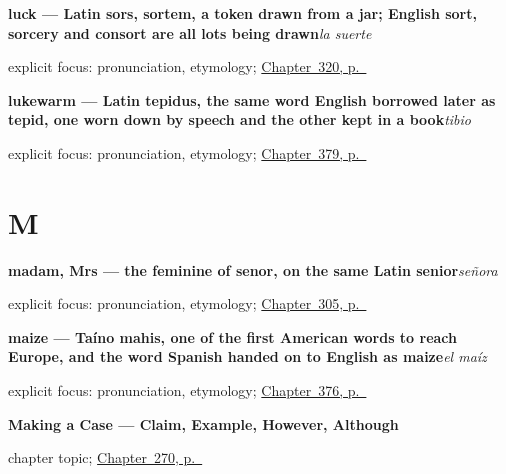\noindent\begin{minipage}[t]{\linewidth}
\raggedright
\textbf{luck — Latin sors, sortem, a token drawn from a jar; English sort, sorcery and consort are all lots being drawn}\enspace\emph{la suerte}\par
\footnotesize explicit focus: pronunciation, etymology; \hyperref[ch:favor-y-culpa]{Chapter~320, p.~\pageref*{ch:favor-y-culpa}}
\end{minipage}\par\smallskip

\noindent\begin{minipage}[t]{\linewidth}
\raggedright
\textbf{lukewarm — Latin tepidus, the same word English borrowed later as tepid, one worn down by speech and the other kept in a book}\enspace\emph{tibio}\par
\footnotesize explicit focus: pronunciation, etymology; \hyperref[ch:seco-y-mojado]{Chapter~379, p.~\pageref*{ch:seco-y-mojado}}
\end{minipage}\par\smallskip

\section*{M}

\noindent\begin{minipage}[t]{\linewidth}
\raggedright
\textbf{madam, Mrs — the feminine of senor, on the same Latin senior}\enspace\emph{señora}\par
\footnotesize explicit focus: pronunciation, etymology; \hyperref[ch:nombre-y-apellido]{Chapter~305, p.~\pageref*{ch:nombre-y-apellido}}
\end{minipage}\par\smallskip

\noindent\begin{minipage}[t]{\linewidth}
\raggedright
\textbf{maize — Taíno mahis, one of the first American words to reach Europe, and the word Spanish handed on to English as maize}\enspace\emph{el maíz}\par
\footnotesize explicit focus: pronunciation, etymology; \hyperref[ch:la-harina-y-la-uva]{Chapter~376, p.~\pageref*{ch:la-harina-y-la-uva}}
\end{minipage}\par\smallskip

\noindent\begin{minipage}[t]{\linewidth}
\raggedright
\textbf{Making a Case --- Claim, Example, However, Although}\par
\footnotesize chapter topic; \hyperref[ch:argumentar]{Chapter~270, p.~\pageref*{ch:argumentar}}
\end{minipage}\par\smallskip

